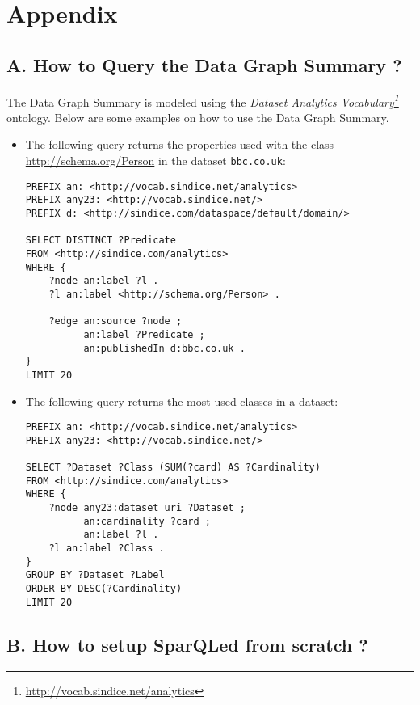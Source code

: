 \appendix
\clearpage
\chapter{Appendix}

\section{A. How to Query the Data Graph Summary ?}

The Data Graph Summary is modeled using the \emph{Dataset Analytics Vocabulary\footnote{\url{http://vocab.sindice.net/analytics}}} ontology. Below are some examples on how to use the Data Graph Summary.

\begin{itemize}
\item The following query returns the properties used with the class \url{http://schema.org/Person} in the dataset \texttt{bbc.co.uk}:

\lstset{language=SQL,basicstyle=\footnotesize}
\begin{lstlisting}
PREFIX an: <http://vocab.sindice.net/analytics>
PREFIX any23: <http://vocab.sindice.net/>
PREFIX d: <http://sindice.com/dataspace/default/domain/>

SELECT DISTINCT ?Predicate
FROM <http://sindice.com/analytics>
WHERE {
    ?node an:label ?l .
    ?l an:label <http://schema.org/Person> .
    
    ?edge an:source ?node ;
          an:label ?Predicate ;
          an:publishedIn d:bbc.co.uk .
}
LIMIT 20
\end{lstlisting}


\item The following query returns the most used classes in a dataset:

\lstset{language=SQL,basicstyle=\footnotesize}
\begin{lstlisting}
PREFIX an: <http://vocab.sindice.net/analytics>
PREFIX any23: <http://vocab.sindice.net/>

SELECT ?Dataset ?Class (SUM(?card) AS ?Cardinality)
FROM <http://sindice.com/analytics>
WHERE {
    ?node any23:dataset_uri ?Dataset ;
          an:cardinality ?card ;
          an:label ?l .
    ?l an:label ?Class .
}
GROUP BY ?Dataset ?Label
ORDER BY DESC(?Cardinality)
LIMIT 20
\end{lstlisting}
\end{itemize}

\section{B. How to setup SparQLed from scratch ?}


